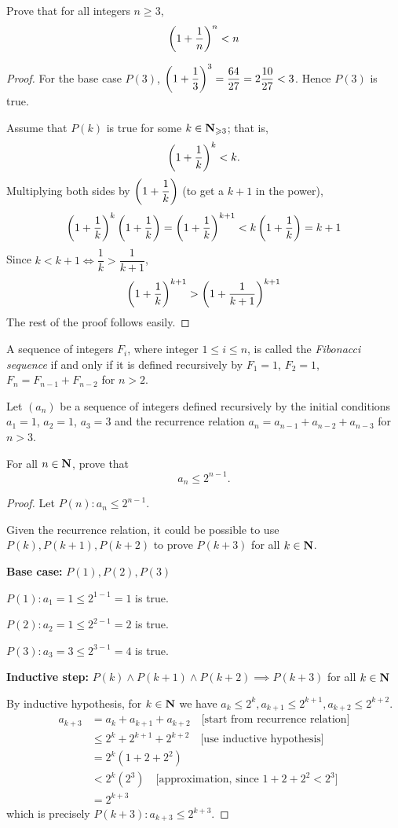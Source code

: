 \begin{prbm}
Prove that for all integers $n \ge 3$, 
\[ \left(1+\frac{1}{n}\right)^n<n \]
\end{prbm}

\begin{proof}
For the base case $P(3)$, $\left(1+\dfrac{1}{3}\right)^3=\dfrac{64}{27}=2\dfrac{10}{27}<3$. Hence $P(3)$ is true.

Assume that $P(k)$ is true for some $k\in\mathbf N_{\geqslant3}$; that is,
\[\left(1+\frac{1}{k}\right)^k<k.\]
Multiplying both sides by $\left(1+\dfrac{1}{k}\right)$ (to get a $k+1$ in the power),
\[ \left(1+\frac{1}{k}\right)^k\left(1+\frac{1}{k}\right)=\left(1+\frac{1}{k}\right)^{k+1}<k\left(1+\frac{1}{k}\right)=k+1  \]
Since $k<k+1 \iff \dfrac{1}{k}>\dfrac{1}{k+1}$, 
\[ \left(1+\frac{1}{k}\right)^{k+1} > \left(1+\frac{1}{k+1}\right)^{k+1} \]
The rest of the proof follows easily.
\end{proof}

A sequence of integers $F_i$, where integer $1\le i\le n$, is called the \emph{Fibonacci sequence} if and only if it is defined recursively by $F_1=1$, $F_2=1$, $F_n=F_{n-1}+F_{n-2}$ for $n>2$.

\begin{prbm}
Let $(a_n)$ be a sequence of integers defined recursively by the initial conditions $a_1=1$, $a_2=1$, $a_3=3$ and the recurrence relation $a_n=a_{n-1}+a_{n-2}+a_{n-3}$ for $n>3$.

For all $n\in\mathbf N$, prove that
\[ a_n\le2^{n-1}. \]
\end{prbm}

\begin{proof}
Let $P(n):a_n\le2^{n-1}$.

Given the recurrence relation, it could be possible to use $P(k),P(k+1),P(k+2)$ to prove $P(k+3)$ for all $k\in\mathbf N$.

\textbf{Base case:} $P(1),P(2),P(3)$

$P(1):a_1=1\le2^{1-1}=1$ is true.

$P(2):a_2=1\le2^{2-1}=2$ is true.

$P(3):a_3=3\le2^{3-1}=4$ is true.

\textbf{Inductive step:} $P(k)\land P(k+1)\land P(k+2)\implies P(k+3)$ for all $k\in\mathbf N$

By inductive hypothesis, for $k\in\mathbf N$ we have $a_k\le2^k, a_{k+1}\le2^{k+1}, a_{k+2}\le2^{k+2}$.
\begin{align*}
a_{k+3} &= a_k+a_{k+1}+a_{k+2} \quad \text{[start from recurrence relation]} \\
&\le 2^k+2^{k+1}+2^{k+2} \quad \text{[use inductive hypothesis]} \\
&= 2^k(1+2+2^2) \\
&< 2^k(2^3) \quad \text{[approximation, since $1+2+2^2<2^3$]} \\
&= 2^{k+3}
\end{align*}
which is precisely $P(k+3):a_{k+3}\le2^{k+3}$.
\end{proof}

